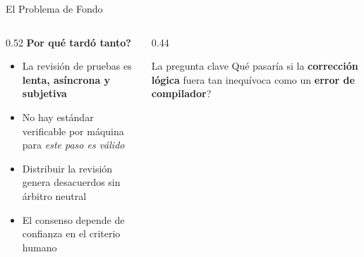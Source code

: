 \documentclass[aspectratio=169, 10pt]{beamer}
\begin{document}
\begin{frame}{El Problema de Fondo}
  \begin{columns}[T]
    \begin{column}{0.52\textwidth}
      \textbf{\textquestiondown Por qu\'{e} tard\'{o} tanto?}
      \vspace{0.3cm}
      \begin{itemize}
        \item La revisi\'{o}n de pruebas es \textbf{lenta, as\'{i}ncrona y subjetiva}
        \item No hay est\'{a}ndar verificable por m\'{a}quina para \textit{este paso es v\'{a}lido}
        \item Distribuir la revisi\'{o}n genera desacuerdos sin \'{a}rbitro neutral
        \item El consenso depende de confianza en el criterio humano
      \end{itemize}
    \end{column}
    \begin{column}{0.44\textwidth}
      \vspace{0.5cm}
      \begin{block}{\centering La pregunta clave}
        \centering\vspace{0.3cm}
        \textquestiondown Qu\'{e} pasar\'{i}a si la \textbf{correcci\'{o}n l\'{o}gica}
        fuera tan inequ\'{i}voca como un \textbf{error de compilador}?
        \vspace{0.3cm}
      \end{block}
    \end{column}
  \end{columns}
\end{frame}
\end{document}
